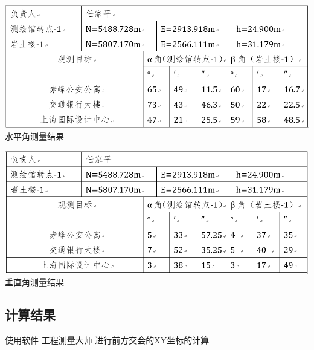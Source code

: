 \documentclass[a4paper,16pt,UTF8]{article}
\begin{document}
\begin{center}
    \includegraphics[scale = 0.6]{uvpyjc.png}
    水平角测量结果

    \includegraphics[scale = 0.6]{ivvijc.png}
    垂直角测量结果

\end{center}

\subsection{计算结果}
使用软件 工程测量大师 进行前方交会的XY坐标的计算
\end{document}
